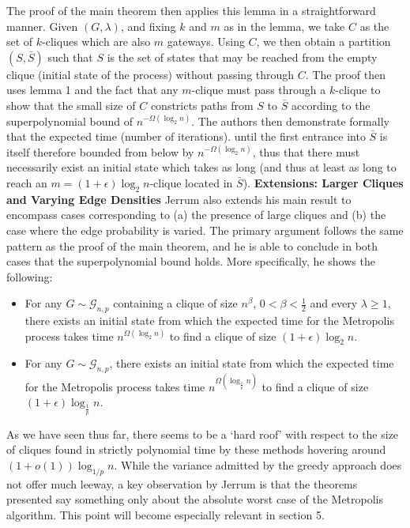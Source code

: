 \documentclass{article}
\theoremstyle{definition}
\begin{document}
The proof of the main theorem then applies this lemma in a straightforward manner.
Given $(G,\lambda)$, and fixing $k$ and $m$ as in the lemma, we take $C$ as the 
set of $k$-cliques which are also $m$ gateways.  Using $C$, we then obtain a 
partition $(S,\bar{S})$ such that $S$ is the set of states that may be reached 
from the empty clique (initial state of the process) without passing through $C$.
The proof then uses lemma 1 and the fact that any $m$-clique must pass through a 
$k$-clique to show that the small size of $C$ constricts paths from $S$ to $\bar{S}$ 
according to the superpolynomial bound of $n^{-\Omega(\log_2{n})}$.
The authors then demonstrate formally that the expected time (number of iterations).
until the first entrance into $\bar{S}$ is itself therefore bounded from below by 
$n^{-\Omega(\log_2{n})}$, thus that there must necessarily exist an initial state which takes as long (and thus at least as long to reach an $m=(1+\epsilon) \log_2{n}$-clique located in $\bar{S}$).
\newline\newline
\noindent \textbf{Extensions: Larger Cliques and Varying Edge Densities } Jerrum 
also extends his main result to encompass cases corresponding to (a) the presence 
of large cliques and (b) the case where the edge probability is varied.  The 
primary argument follows the same pattern as the proof of the main theorem, and 
he is able to conclude in both cases that the superpolynomial bound holds.  More 
specifically, he shows the following:
\begin{itemize}
\item{For any $G \sim \mathcal{G}_{n,p}$ containing a clique of size 
$n^\beta$, $0 < \beta < \frac{1}{2}$ and every $\lambda \geq 1$, there exists an initial state from which the expected time for the Metropolis process takes time 
$n^{\Omega(\log_2{n})}$ to find a clique of size $(1+\epsilon)\log_2{n}$.
}
\item{For any $G \sim \mathcal{G}_{n,p}$, there exists an initial state from which the expected time for the Metropolis process takes time 
$n^{\Omega(\log_{\frac{1}{p}}{n})}$ to find a clique of size $(1+\epsilon)\log_{\frac{1}{p}}{n}$.}
\end{itemize} 

As we have seen thus far, there seems to be a `hard roof' with respect to the size 
of cliques found in strictly polynomial time by these methods hovering around 
$(1+o(1))\log_{1/p}{n}$.  While the variance admitted by the greedy approach does 
not offer much leeway, a key observation by Jerrum is that the theorems presented 
say something only about the absolute worst case of the Metropolis algorithm.  This 
point will become especially relevant in section 5.
\end{document}

